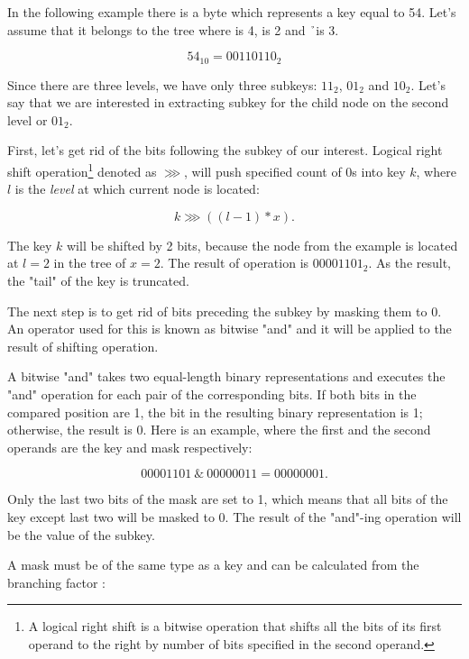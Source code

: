 In the following example there is a byte which represents a key equal to 54. Let's assume that it belongs to the tree where \m{} is 4, \x{} is 2 and \h\ is 3. 

\begin{equation}
    54_{10} = 00110110_2    
\end{equation}

Since there are three levels, we have only three subkeys: $11_2$, $01_2$ and $10_2$. Let's say that we are interested in extracting subkey for the child node on the second level or $01_2$. 

First, let's get rid of the bits following the subkey of our interest. Logical right shift operation\footnote{A logical right shift is a bitwise operation that shifts all the bits of its first operand to the right by number of bits specified in the second operand.} denoted as $\ggg$, will push specified count of 0s into key $k$, where $l$ is the \emph{level} at which current node is located: 

\begin{equation}
    k \ggg ((l - 1) * x).
\end{equation}

The key $k$ will be shifted by 2 bits, because the node from the example is located at $l = 2$ in the tree of $x = 2$. The result of operation is $00001101_2$. As the result, the "tail" of the key is truncated.

The next step is to get rid of bits preceding the subkey by masking them to 0. An operator used for this is known as bitwise "and" and it will be applied to the result of shifting operation. 

A bitwise "and" takes two equal-length binary representations and executes the "and" operation for each pair of the corresponding bits. If both bits in the compared position are 1, the bit in the resulting binary representation is 1; otherwise, the result is 0. Here is an example, where the first and the second operands are the key and mask respectively: 

\begin{equation}
    00001101 \ \& \ 00000011 = 00000001.
\end{equation}                        

Only the last two bits of the mask are set to 1, which means that all bits of the key except last two will be masked to 0. The result of the "and"-ing operation will be the value of the subkey.

A mask must be of the same type as a key and can be calculated from the branching factor \m:

